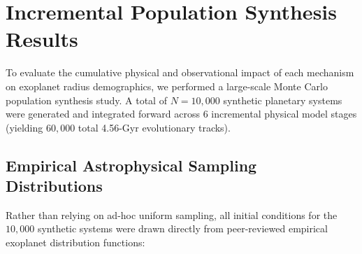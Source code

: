\section{Incremental Population Synthesis Results}

To evaluate the cumulative physical and observational impact of each mechanism on exoplanet radius demographics, we performed a large-scale Monte Carlo population synthesis study. A total of $N = 10,000$ synthetic planetary systems were generated and integrated forward across $6$ incremental physical model stages (yielding $60,000$ total 4.56-Gyr evolutionary tracks).

\subsection{Empirical Astrophysical Sampling Distributions}
Rather than relying on ad-hoc uniform sampling, all initial conditions for the $10,000$ synthetic systems were drawn directly from peer-reviewed empirical exoplanet distribution functions:
